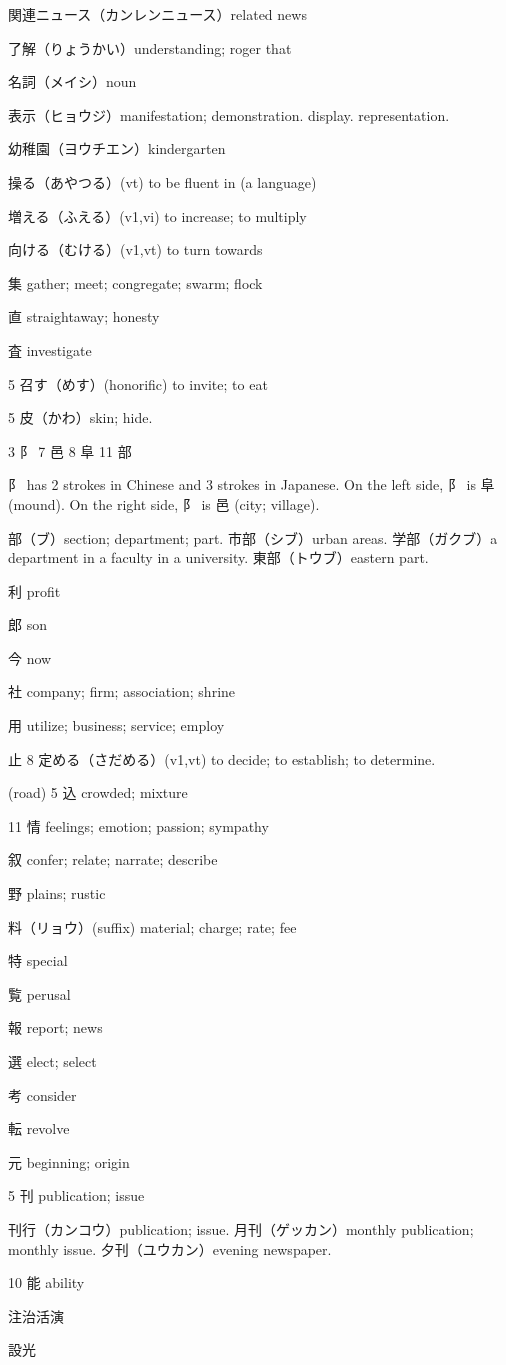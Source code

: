 関連ニュース（カンレンニュース）related news

了解（りょうかい）understanding; roger that

名詞（メイシ）noun

表示（ヒョウジ）manifestation; demonstration. display. representation.

幼稚園（ヨウチエン）kindergarten

操る（あやつる）(vt) to be fluent in (a language)

増える（ふえる）(v1,vi) to increase; to multiply

向ける（むける）(v1,vt) to turn towards

集 gather; meet; congregate; swarm; flock

直 straightaway; honesty

査 investigate

5 召す（めす）(honorific) to invite; to eat

5 皮（かわ）skin; hide.

3 阝 7 邑 8 阜 11 部

阝 has 2 strokes in Chinese and 3 strokes in Japanese.
On the left side, 阝 is 阜 (mound).
On the right side, 阝 is 邑 (city; village).

部（ブ）section; department; part.
市部（シブ）urban areas.
学部（ガクブ）a department in a faculty in a university.
東部（トウブ）eastern part.

利 profit

郎 son

今 now

社 company; firm; association; shrine

用 utilize; business; service; employ

止 8 定める（さだめる）(v1,vt) to decide; to establish; to determine.

(road) 5 込 crowded; mixture

11 情 feelings; emotion; passion; sympathy

叙 confer; relate; narrate; describe

野 plains; rustic

料（リョウ）(suffix) material; charge; rate; fee

特 special

覧 perusal

報 report; news

選 elect; select

考 consider

転 revolve

元 beginning; origin

5 刊 publication; issue

刊行（カンコウ）publication; issue.
月刊（ゲッカン）monthly publication; monthly issue.
夕刊（ユウカン）evening newspaper.

10 能 ability

注治活演

設光
